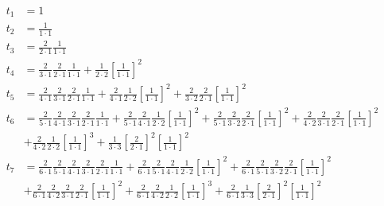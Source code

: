 \begin{equation*}
\begin{aligned}
t_1 &= 1 \\
t_2 &= \frac{1}{1 \cdot 1} 
\\
t_3 &= 
\frac{2}{2 \cdot 1} 
\frac{1}{1 \cdot 1}
\\
t_4 &= 
  \frac{2}{3 \cdot 1} 
  \frac{2}{2 \cdot 1} 
  \frac{1}{1 \cdot 1} 
+ \frac{1}{2 \cdot 2} 
  \left[
  \frac{1}{1 \cdot 1}
  \right]^2
\\
t_5 &= 
  \frac{2}{4 \cdot 1}
  \frac{2}{3 \cdot 1} 
  \frac{2}{2 \cdot 1} 
  \frac{1}{1 \cdot 1} 
+ \frac{2}{4 \cdot 1}
  \frac{1}{2 \cdot 2} 
  \left[
  \frac{1}{1 \cdot 1}
  \right]^2
+ \frac{2}{3 \cdot 2} 
  \frac{2}{2 \cdot 1} 
  \left[
  \frac{1}{1 \cdot 1}
  \right]^2 
\\
t_6 &=
  \frac{2}{5 \cdot 1}
  \frac{2}{4 \cdot 1}
  \frac{2}{3 \cdot 1} 
  \frac{2}{2 \cdot 1} 
  \frac{1}{1 \cdot 1} 
+ \frac{2}{5 \cdot 1}
  \frac{2}{4 \cdot 1}
  \frac{1}{2 \cdot 2} 
  \left[
  \frac{1}{1 \cdot 1}
  \right]^2
+ \frac{2}{5 \cdot 1}
  \frac{2}{3 \cdot 2} 
  \frac{2}{2 \cdot 1} 
  \left[
  \frac{1}{1 \cdot 1}
  \right]^2
+ \frac{2}{4 \cdot 2}
  \frac{2}{3 \cdot 1} 
  \frac{2}{2 \cdot 1} 
  \left[
  \frac{1}{1 \cdot 1}
  \right]^2 
\\
&
+ \frac{2}{4 \cdot 2}
  \frac{1}{2 \cdot 2} 
  \left[
  \frac{1}{1 \cdot 1}
  \right]^3
+ \frac{1}{3 \cdot 3} 
  \left[
  \frac{2}{2 \cdot 1}
  \right]^2
  \left[
  \frac{1}{1 \cdot 1}
  \right]^2 
\\
t_7 &= 
  \frac{2}{6 \cdot 1}
  \frac{2}{5 \cdot 1}
  \frac{2}{4 \cdot 1}
  \frac{2}{3 \cdot 1} 
  \frac{2}{2 \cdot 1} 
  \frac{1}{1 \cdot 1} 
+ \frac{2}{6 \cdot 1}
  \frac{2}{5 \cdot 1}
  \frac{2}{4 \cdot 1}
  \frac{1}{2 \cdot 2} 
  \left[
  \frac{1}{1 \cdot 1}
  \right]^2
+ \frac{2}{6 \cdot 1}
  \frac{2}{5 \cdot 1}
  \frac{2}{3 \cdot 2} 
  \frac{2}{2 \cdot 1} 
  \left[
  \frac{1}{1 \cdot 1}
  \right]^2 
\\
&
+ \frac{2}{6 \cdot 1}
  \frac{2}{4 \cdot 2}
  \frac{2}{3 \cdot 1} 
  \frac{2}{2 \cdot 1} 
  \left[
  \frac{1}{1 \cdot 1}
  \right]^2
+ \frac{2}{6 \cdot 1}
  \frac{2}{4 \cdot 2}
  \frac{1}{2 \cdot 2} 
  \left[
  \frac{1}{1 \cdot 1}
  \right]^3
+ \frac{2}{6 \cdot 1}
  \frac{1}{3 \cdot 3} 
  \left[
  \frac{2}{2 \cdot 1}
  \right]^2
  \left[
  \frac{1}{1 \cdot 1}
  \right]^2 

\end{aligned}
\end{equation*}
